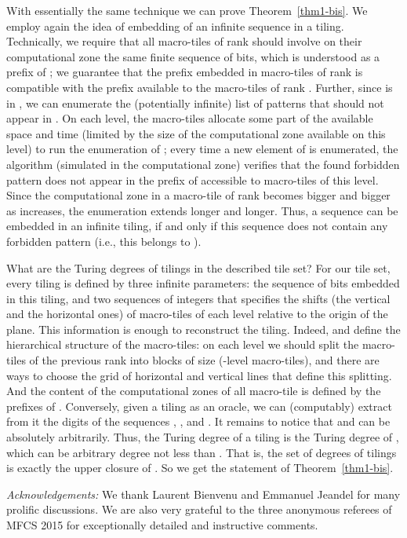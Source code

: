 \documentclass[runningheads]{llncs}
\begin{document}
With essentially the same technique we can prove Theorem~\ref{thm1-bis}. We employ again the idea of embedding of an infinite sequence  in a tiling. Technically, we require that all macro-tiles of rank  should involve on their computational zone the same finite sequence of  bits, which is understood as a prefix of ; we guarantee that the prefix embedded in macro-tiles of rank  is compatible with the prefix available to the macro-tiles of rank . Further, since  is in , we can enumerate the (potentially infinite) list of patterns that should not appear in . On each level, the macro-tiles allocate some part of  the available space and time (limited by the size of the computational zone available on this level) to run the enumeration of ; every time a new element of  is enumerated,  the algorithm (simulated in the computational zone) verifies that the found forbidden pattern does not appear in the prefix of  accessible to macro-tiles of this level. Since the computational zone in a macro-tile of rank  becomes bigger and bigger as  increases, the enumeration extends longer and longer. Thus, a sequence  can be embedded in an infinite tiling, if and only if this sequence does not contain any forbidden pattern (i.e., this  belongs to ).

What are the Turing degrees of tilings in the described tile set? For our tile set, every tiling is defined by three infinite parameters: the sequence of bits  embedded in this tiling, and two sequences of integers  that specifies the shifts (the vertical and the horizontal ones) of macro-tiles of each level relative to the origin of the plane. This information is enough to reconstruct the tiling. Indeed,  and  define the hierarchical  structure of the macro-tiles: on each level  we should split the macro-tiles of the previous rank into blocks of size  (-level macro-tiles), and there are  ways to choose the grid of horizontal and vertical lines that define this splitting. And the content of the computational zones of all macro-tile is defined by the prefixes of .
Conversely, given a tiling as an oracle, we can (computably) extract from it the digits of the sequences , , and .
It remains to notice that  and  can be absolutely arbitrarily.
Thus, the Turing degree of a tiling is the Turing degree of  , which can be arbitrary degree not less than . That is, the set of degrees of tilings is exactly the upper closure of . So we get the statement of  Theorem~\ref{thm1-bis}.

\smallskip

\emph{Acknowledgements:} We thank Laurent Bienvenu and Emmanuel Jeandel for many prolific discussions. We are also very grateful to the three anonymous referees of MFCS 2015 for exceptionally detailed and instructive comments.
\end{document}
